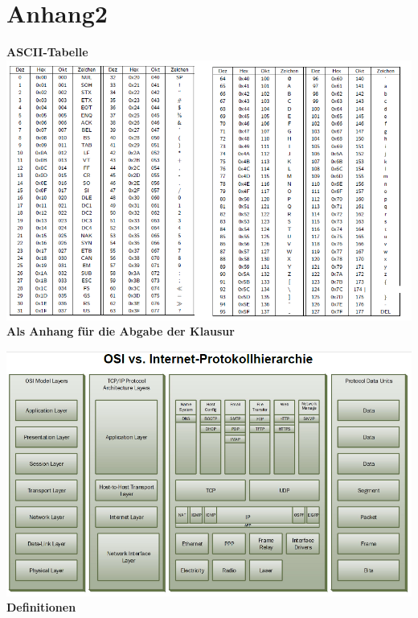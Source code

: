 \documentclass[fs, footer]{latex4ei}
\begin{document}
\newpage
\section{Anhang2}
\textbf{ASCII-Tabelle}
 \includegraphics[scale = 1.1]{./img/Ascii.png} \\
 
 \newpage
 \textbf{Als Anhang für die Abgabe der Klausur}

 \includegraphics[scale = 1.1]{./img/OSI_Modell3.png} \\


	\textbf{Definitionen}	
	
\end{document}

